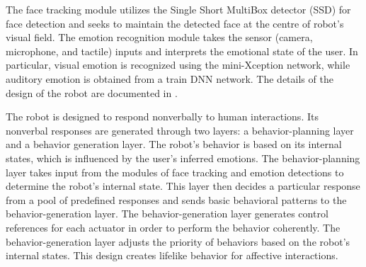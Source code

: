 \documentclass[letterpaper, 10 pt, conference]{ieeeconf}  %
\begin{document}
The face tracking module utilizes the Single Short MultiBox detector (SSD) for face detection and seeks to maintain the detected face at the centre of robot's visual field. The emotion recognition module takes the sensor (camera, microphone, and tactile) inputs and interprets the emotional state of the user. In particular, visual emotion is recognized using the mini-Xception network, while auditory emotion is obtained from a train DNN network. The details of the design of the robot are documented in \cite{amrita2019thesis}. 

The robot is designed to respond nonverbally to human interactions. Its nonverbal responses are generated through two layers: a behavior-planning layer and a behavior generation layer. The robot's behavior is based on its internal states, which is influenced by the user's inferred emotions. The behavior-planning layer takes input from the modules of face tracking and emotion detections to determine the robot's internal state. This layer then decides a particular response from a pool of predefined responses and sends basic behavioral patterns to the behavior-generation layer. The behavior-generation layer generates control references for each actuator in order to perform the behavior coherently. The behavior-generation layer adjusts the priority of behaviors based on the robot's internal states. This design creates lifelike behavior for affective interactions.



\end{document}

